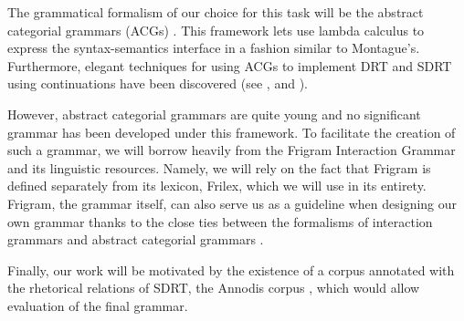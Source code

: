 The grammatical formalism of our choice for this task will be the
abstract categorial grammars (ACGs) \cite{de2001towards}. This framework
lets use lambda calculus to express the syntax-semantics interface in a
fashion similar to Montague's. Furthermore, elegant techniques for using
ACGs to implement DRT and SDRT using continuations have been
discovered (see \cite{de2006towards}, \cite{asher2011sdrt} and
\cite{asher2011montagovian}).

However, abstract categorial grammars are quite young and no significant
grammar has been developed under this framework. To facilitate the
creation of such a grammar, we will borrow heavily from the Frigram
Interaction Grammar \cite{perrier2007french} and its linguistic
resources. Namely, we will rely on the fact that Frigram is defined
separately from its lexicon, Frilex, which we will use in its
entirety. Frigram, the grammar itself, can also serve us as a guideline
when designing our own grammar thanks to the close ties between the
formalisms of interaction grammars and abstract categorial grammars
\cite{perrier1999intuitionistic}.

Finally, our work will be motivated by the existence of a corpus
annotated with the rhetorical relations of SDRT, the Annodis corpus
\cite{afantenos2012empirical}, which would allow evaluation of the final
grammar.
